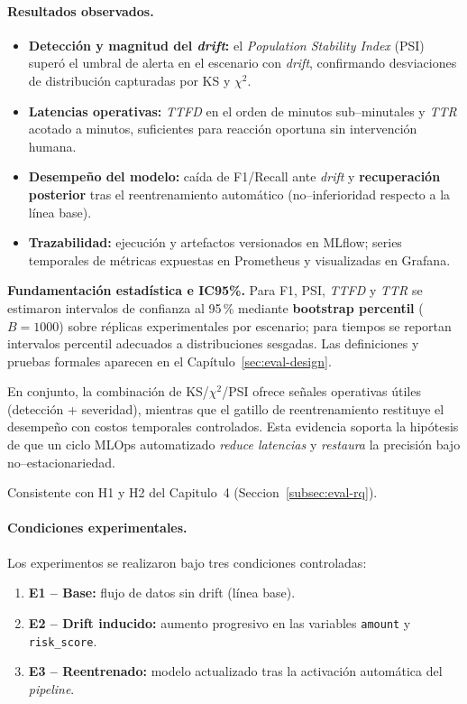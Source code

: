 \paragraph{Resultados observados.}
\begin{itemize}\setlength\itemsep{2pt}
  \item \textbf{Detección y magnitud del \textit{drift}:} el \textit{Population Stability Index} (PSI) superó el umbral de alerta en el escenario con \textit{drift}, confirmando desviaciones de distribución capturadas por KS y $\chi^2$.
  \item \textbf{Latencias operativas:} \textit{TTFD} en el orden de minutos sub–minutales y \textit{TTR} acotado a minutos, suficientes para reacción oportuna sin intervención humana.
  \item \textbf{Desempeño del modelo:} caída de F1/Recall ante \textit{drift} y \textbf{recuperación posterior} tras el reentrenamiento automático (no–inferioridad respecto a la línea base).
  \item \textbf{Trazabilidad:} ejecución y artefactos versionados en MLflow; series temporales de métricas expuestas en Prometheus y visualizadas en Grafana.
\end{itemize}

\noindent
\textbf{Fundamentaci\'on estad\'istica e IC95\%.} Para F1, PSI, \textit{TTFD} y \textit{TTR} se estimaron intervalos de confianza al 95\,\% mediante \textbf{bootstrap percentil} ($B=1000$) sobre r\'eplicas experimentales por escenario; para tiempos se reportan intervalos percentil adecuados a distribuciones sesgadas. Las definiciones y pruebas formales aparecen en el Cap\'itulo~\ref{sec:eval-design}.

En conjunto, la combinación de KS/$\chi^2$/PSI ofrece señales operativas útiles (detección + severidad), mientras que el gatillo de reentrenamiento restituye el desempeño con costos temporales controlados. Esta evidencia soporta la hipótesis de que un ciclo MLOps automatizado \emph{reduce latencias} y \emph{restaura} la precisión bajo no–estacionariedad.


Consistente con H1 y H2 del Capitulo~4 (Seccion~\ref{subsec:eval-rq}).
\paragraph{Condiciones experimentales.}
Los experimentos se realizaron bajo tres condiciones controladas:
\begin{enumerate}
    \item \textbf{E1 – Base:} flujo de datos sin drift (línea base).
    \item \textbf{E2 – Drift inducido:} aumento progresivo en las variables \texttt{amount} y \texttt{risk\_score}.
    \item \textbf{E3 – Reentrenado:} modelo actualizado tras la activación automática del \textit{pipeline}.
\end{enumerate}

